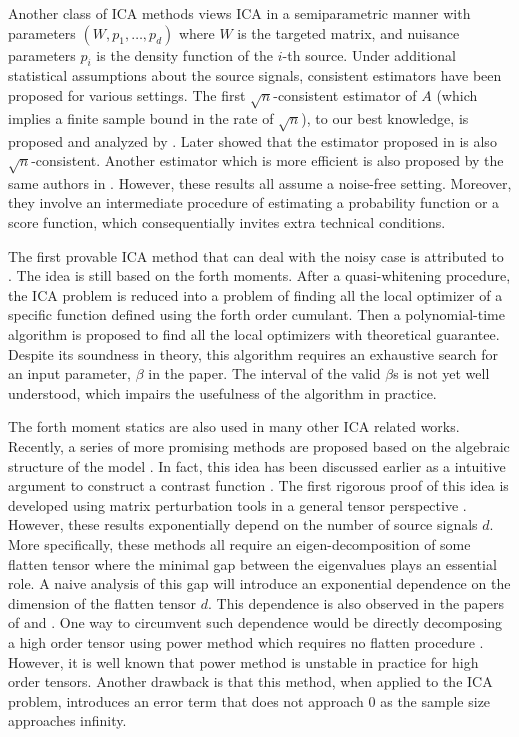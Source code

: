 \documentclass[twoside]{article}
\theoremstyle{definition}
\begin{document}
Another class of ICA methods views ICA in a semiparametric manner with parameters $(W, p_1, \ldots, p_d)$ where $W$ is the targeted matrix, and nuisance parameters $p_i$ is the density function of the $i$-th source. 
Under additional statistical assumptions about the source signals, consistent estimators have been proposed for various settings. The first  $\sqrt{n}$-consistent estimator of $A$ (which implies a finite sample bound in the rate of $\sqrt{n}$), to our best knowledge, is proposed and analyzed by \citet{samarov2004nonparametric}.  
Later \citet{chen2005consistent} showed that the estimator proposed in \citet{eriksson2003characteristic} is also $\sqrt{n}$-consistent. Another estimator which is more efficient is also proposed by the same authors in \citep{chen2006efficient}.
However, these results all assume a noise-free setting. 
Moreover, they involve an intermediate procedure of estimating a probability function or a score function, which consequentially invites extra technical conditions. 

The first provable ICA method that can deal with the noisy case is attributed to \citet{arora2012provable}. 
The idea is still based on the forth moments. 
After a quasi-whitening procedure, the ICA problem is reduced into a problem of finding all the local optimizer of a specific function defined using the forth order cumulant. Then a polynomial-time algorithm is proposed to find all the local optimizers with theoretical guarantee.
Despite its soundness in theory, this algorithm requires an exhaustive search for an input parameter, $\beta$ in the paper.
The interval of the valid $\beta$s is not yet well understood, which impairs the usefulness of the algorithm in practice.

The forth moment statics are also used in many other ICA related works. 
Recently, a series of more promising methods are proposed based on the algebraic structure of the model \citep{hsu2013learning,anandkumar2012tensordecomposition,anandkumar2012method}. 
In fact, this idea has been discussed earlier as a intuitive argument to construct a contrast function \citep{cardoso1999high}. 
The first rigorous proof of this idea is developed using matrix perturbation tools in a general tensor perspective \citep{anandkumar2012tensordecomposition,anandkumar2012method,goyal2014fourier}. 
However, these results exponentially depend on the number of source signals $d$.
More specifically, these methods all require an eigen-decomposition of some flatten tensor where the minimal gap between the eigenvalues plays an essential role. 
A naive analysis of this gap will introduce an exponential dependence on the dimension of the flatten tensor $d$. 
This dependence is also observed in the papers of \citet{cardoso1999high} and \citet{goyal2014fourier}.
One way to circumvent such dependence would be directly decomposing a high order tensor using power method which requires no flatten procedure \citep{anandkumar2014guaranteed}. 
However, it is well known that power method is unstable in practice for high order tensors. 
Another drawback is that this method, when applied to the ICA problem, introduces an error term that does not approach 0 as the sample size approaches infinity. 
\end{document}
